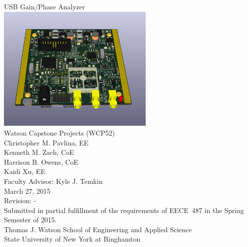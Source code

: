 \begin{titlingpage}
\begin{vplace}[0.5]
\begin{center}
{\Huge USB Gain/Phase Analyzer} \\
\includegraphics[width=3in]{full3d.png} \\
{\Huge Watson Capstone Projects (WCP52)} \\ \vspace{1cm}
{\Huge Christopher M. Pavlina, EE} \\
{\Huge Kenneth M. Zach, CoE} \\
{\Huge Harrison B. Owens, CoE} \\
{\Huge Kaidi Xu, EE} \\ \vspace{1cm}
{\Huge Faculty Advisor: Kyle J. Temkin} \\ \vspace{1cm}
{\Huge March 27, 2015} \\
{\Huge Revision: -} \\ \vspace{1cm}
{Submitted in partial fulfillment of the requirements of EECE~487 in the Spring Semester of 2015.} \\ \vspace{1cm}
{Thomas J. Watson School of Engineering and Applied Science} \\
{State University of New York at Binghamton} \\
\end{center}
\end{vplace}
\end{titlingpage}
